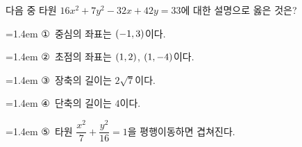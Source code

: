 다음 중 타원 $16x^2+7y^2-32x+42y=33$에 대한 설명으로 옳은 것은?
\par\medskip\par\noindent\hangindent=1.4em {\small ①}\ 중심의 좌표는 $(-1{,}\mkern3mu\mathopen{}3)$이다.\par\noindent\hangindent=1.4em {\small ②}\ 초점의 좌표는 $(1{,}\mkern3mu\mathopen{}2)$, $(1{,}\mkern3mu\mathopen{}-4)$이다.\par\noindent\hangindent=1.4em {\small ③}\ 장축의 길이는 $2\sqrt{7}$이다.\par\noindent\hangindent=1.4em {\small ④}\ 단축의 길이는 $4$이다.\par\noindent\hangindent=1.4em {\small ⑤}\ 타원 $\dfrac{x^2}{7}+\dfrac{y^2}{16}=1$을 평행이동하면 겹쳐진다.\par\medskip
